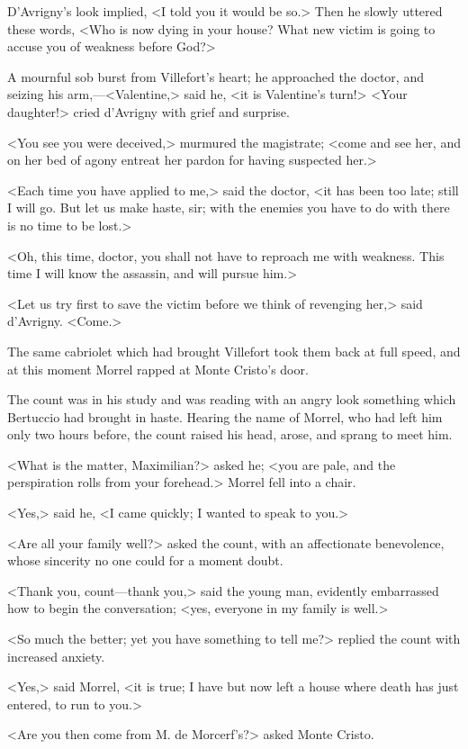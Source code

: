  D'Avrigny's look implied, <I told you it would be so.> Then he slowly uttered these words, <Who is now dying in your house? What new victim is going to accuse you of weakness before God?> 

 A mournful sob burst from Villefort's heart; he approached the doctor, and seizing his arm,—<Valentine,> said he, <it is Valentine's turn!>  <Your daughter!> cried d'Avrigny with grief and surprise. 

 <You see you were deceived,> murmured the magistrate; <come and see her, and on her bed of agony entreat her pardon for having suspected her.> 

 <Each time you have applied to me,> said the doctor, <it has been too late; still I will go. But let us make haste, sir; with the enemies you have to do with there is no time to be lost.> 

 <Oh, this time, doctor, you shall not have to reproach me with weakness. This time I will know the assassin, and will pursue him.> 

 <Let us try first to save the victim before we think of revenging her,> said d'Avrigny. <Come.> 

 The same cabriolet which had brought Villefort took them back at full speed, and at this moment Morrel rapped at Monte Cristo's door. 

 The count was in his study and was reading with an angry look something which Bertuccio had brought in haste. Hearing the name of Morrel, who had left him only two hours before, the count raised his head, arose, and sprang to meet him. 

 <What is the matter, Maximilian?> asked he; <you are pale, and the perspiration rolls from your forehead.> Morrel fell into a chair. 

 <Yes,> said he, <I came quickly; I wanted to speak to you.> 

 <Are all your family well?> asked the count, with an affectionate benevolence, whose sincerity no one could for a moment doubt. 

 <Thank you, count—thank you,> said the young man, evidently embarrassed how to begin the conversation; <yes, everyone in my family is well.> 

 <So much the better; yet you have something to tell me?> replied the count with increased anxiety. 

 <Yes,> said Morrel, <it is true; I have but now left a house where death has just entered, to run to you.> 

 <Are you then come from M. de Morcerf's?> asked Monte Cristo. 

